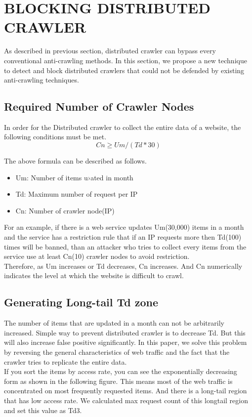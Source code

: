 \documentclass[sigconf,anonymous=true]{acmart}
\begin{document}
%
%
\section{BLOCKING DISTRIBUTED CRAWLER}
As described in previous section, distributed crawler can bypass every conventional anti-crawling methods. In this section, we propose a new technique to detect and block distributed crawlers that could not be defended by existing anti-crawling techniques.

\subsection{Required Number of Crawler Nodes}
In order for the Distributed crawler to collect the entire data of a website, the following conditions must be met.\\
\begin{displaymath}
Cn \geq Um / (Td * 30) 
\end{displaymath}

The above formula can be described as follows.

\begin{itemize}
\item Um: Number of items u›ated in month
\item Td: Maximum number of request per IP
\item Cn: Number of crawler node(IP)
\end{itemize}

For an example, if there is a web service updates Um(30,000) items in a month and the service has a restriction rule that if an IP requests more then Td(100) times will be banned, than an attacker who tries to collect every items from the service use at least Cn(10) crawler nodes to avoid restriction.\\
Therefore, as Um increases or Td decreases, Cn increases. And Cn numerically indicates the level at which the website is difficult to crawl.

\subsection{Generating Long-tail Td zone}
The number of items that are updated in a month can not be arbitrarily increased. Simple way to prevent distributed crawler is to decrease Td. But this will also increase false positive significantly. In this paper, we solve this problem by reversing the general characteristics of web traffic and the fact that the crawler tries to replicate the entire data.\\
If you sort the items by access rate, you can see the exponentially decreasing form as shown in the following figure. This means most of the web traffic is concentrated on most frequently requested items. And there is a long-tail region that has low access rate. We calculated max request count of this longtail region and set this value as Td3.
\end{document}
